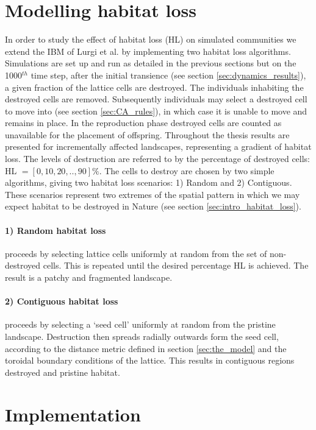 \section{Modelling habitat loss}
\label{sec:model_HL}

In order to study the effect of habitat loss (HL) on simulated communities we extend the IBM of Lurgi et al. \cite{lurgi2015effects} by implementing two habitat loss algorithms. Simulations are set up and run as detailed in the previous sections but on the 1000$^{th}$ time step, after the initial transience (see section \ref{sec:dynamics_results}), a given fraction of the lattice cells are destroyed. The individuals inhabiting the destroyed cells are removed. Subsequently individuals may select a destroyed cell to move into (see section \ref{sec:CA_rules}), in which case it is unable to move and remains in place. In the reproduction phase destroyed cells are counted as unavailable for the placement of offspring. Throughout the thesis results are presented for incrementally affected landscapes, representing a gradient of habitat loss. The levels of destruction are referred to by the percentage of destroyed cells: HL $=[0,10,20,..,90] \%$. The cells to destroy are chosen by two simple algorithms, giving two habitat loss scenarios: 1) Random and 2) Contiguous. These scenarios represent two extremes of the spatial pattern in which we may expect habitat to be destroyed in Nature (see section \ref{sec:intro_habitat_loss}).

\paragraph*{1) Random habitat loss} proceeds by selecting lattice cells uniformly at random from the set of non-destroyed cells. This is repeated until the desired percentage HL is achieved. The result is a patchy and fragmented landscape.  

\paragraph*{2) Contiguous habitat loss} proceeds by selecting a `seed cell' uniformly at random from the pristine landscape. Destruction then spreads radially outwards form the seed cell, according to the distance metric defined in section \ref{sec:the_model} and the toroidal boundary conditions of the lattice. This results in contiguous regions destroyed and pristine habitat.
 

\section{Implementation}
\label{sec:implementation}

